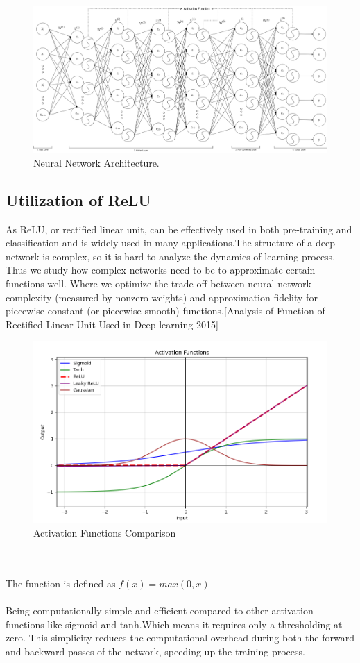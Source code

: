 \documentclass[conference]{IEEEtran}
\begin{document}
\begin{figure}[h]
    \centering
    \includegraphics[width=\linewidth]{AI Architecture.drawio.png}
    \caption{Neural Network Architecture.}
    \label{fig}
\end{figure}

\subsection{Utilization of ReLU}
As ReLU, or rectified linear unit, can be effectively used in both pre-training and classification and is widely used in many applications.The structure of a deep network is complex, so it is hard to analyze the dynamics of learning process. Thus we study how complex networks need to be to approximate certain functions well. Where we optimize the trade-off between neural network complexity (measured by nonzero weights) and approximation fidelity for piecewise constant (or piecewise smooth) functions.[Analysis of Function of Rectified Linear Unit Used in Deep learning 2015]
\begin{figure}[h]
    \centering
    \includegraphics[width=\linewidth]{Activation Functions Compare.PNG}
    \caption{Activation Functions Comparison}
    \label{fig}
\end{figure}
\\
\\
The function is defined as
\(f(x) = max(0,x)\)
\\
\\
Being computationally simple and efficient compared to other activation functions like sigmoid and tanh.Which means it requires only a thresholding at zero. This simplicity reduces the computational overhead during both the forward and backward passes of the network, speeding up the training process.
\end{document}
